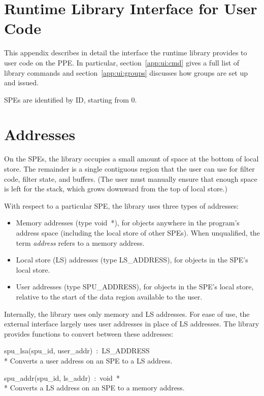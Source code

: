 \section{Runtime Library Interface for User Code}\label{app:ui}

This appendix describes in detail the interface the runtime library provides to user code on the PPE. In particular, section~\ref{app:ui:cmd} gives a full list of library commands and section~\ref{app:ui:groups} discusses how groups are set up and issued.

SPEs are identified by ID, starting from 0.

\section{Addresses}

On the SPEs, the library occupies a small amount of space at the bottom of local store. The remainder is a single contiguous region that the user can use for filter code, filter state, and buffers. (The user must manually ensure that enough space is left for the stack, which grows downward from the top of local store.)

With respect to a particular SPE, the library uses three types of addresses:
\begin{itemize}
\item Memory addresses (type \textsf{void~*}), for objects anywhere in the program's address space (including the local store of other SPEs). When unqualified, the term \emph{address} refers to a memory address.
\item Local store (LS) addresses (type \textsf{LS\_ADDRESS}), for objects in the SPE's local store.
\item User addresses (type \textsf{SPU\_ADDRESS}), for objects in the SPE's local store, relative to the start of the data region available to the user.
\end{itemize}

Internally, the library uses only memory and LS addresses. For ease of use, the external interface largely uses user addresses in place of LS addresses. The library provides functions to convert between these addresses:
\begin{description}
\item \textsf{spu\_lsa(spu\_id, user\_addr)~:~LS\_ADDRESS} \\*
Converts a user address on an SPE to a LS address.

\item \textsf{spu\_addr(spu\_id, ls\_addr)~:~void~*} \\*
Converts a LS address on an SPE to a memory address.
\end{description}

